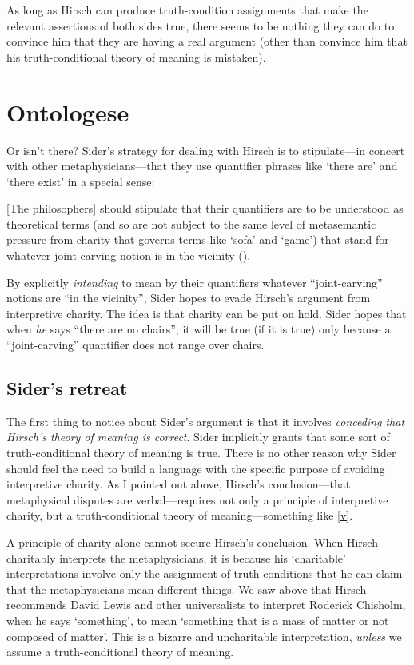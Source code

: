 \documentclass[11pt]{article}
\newenvironment{squote}{%
\begin{spacing}{1}
       	\begin{list}{}{%
\setlength{\labelwidth}{0pt}%
\rightmargin\leftmargin%
}
\item\relax
}{%
\end{list}%
\end{spacing}
}
\begin{document}
\begin{spacing}{1.25}
As long as Hirsch can produce truth-condition assignments that make
the relevant assertions of both sides true, there seems to be nothing
they can do to convince him that they are having a real argument
(other than convince him that his truth-conditional theory of meaning
is mistaken).

\section{Ontologese}
\label{ontologese}
Or isn't there?  Sider's strategy for dealing with Hirsch is to
stipulate---in concert with other metaphysicians---that they use
quantifier phrases like `there are' and `there exist' in a special
sense:

\begin{squote}
{[}The philosophers{]} should stipulate that their quantifiers are to be
understood as theoretical terms (and so are not subject to the same
level of metasemantic pressure from charity that governs terms like
`sofa' and `game') that stand for whatever joint-carving notion is in
the vicinity (\citeyear[9]{sider2011b}).
\end{squote}

By explicitly \emph{intending} to mean by their quantifiers whatever
``joint-carving'' notions are ``in the vicinity'', Sider hopes to
evade Hirsch's argument from interpretive charity.  The idea is that
charity can be put on hold.  Sider hopes that when {\em he} says
``there are no chairs'', it will be true (if it is true) only because
a ``joint-carving'' quantifier does not range over chairs.

\subsection{Sider's retreat}
\label{retreat}
The first thing to notice about Sider's argument is that it involves
{\em conceding that Hirsch's theory of meaning is correct}.  Sider
implicitly grants that some sort of truth-conditional theory of
meaning is true.  There is no other reason why Sider should feel the
need to build a language with the specific purpose of avoiding
interpretive charity.  As I pointed out above, Hirsch's
conclusion---that metaphysical disputes are verbal---requires not only
a principle of interpretive charity, but a truth-conditional theory of
meaning---something like \ref{v}.

A principle of charity alone cannot secure Hirsch's conclusion.  When
Hirsch charitably interprets the metaphysicians, it is because his
`charitable' interpretations involve only the assignment of
truth-conditions that he can claim that the metaphysicians mean
different things.  We saw above that Hirsch recommends David Lewis and
other universalists to interpret Roderick Chisholm, when he says
`something', to mean `something that is a mass of matter or not
composed of matter'.  This is a bizarre and uncharitable
interpretation, {\em unless} we assume a truth-conditional theory of
meaning.


\end{spacing}
\end{document}
